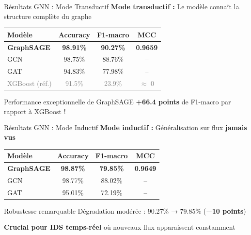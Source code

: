 ﻿\documentclass[aspectratio=169]{beamer}
\begin{document}
\begin{frame}{Résultats GNN : Mode Transductif}
\textbf{Mode transductif :} Le modèle connaît la structure complète du graphe

\vspace{0.5cm}

\begin{center}
\begin{tabular}{lccc}
\toprule
\textbf{Modèle} & \textbf{Accuracy} & \textbf{F1-macro} & \textbf{MCC} \\
\midrule
\textcolor{accentorange}{\textbf{GraphSAGE}} & \textbf{98.91\%} & \textbf{90.27\%} & \textbf{0.9659} \\
GCN & 98.75\% & 88.76\% & -- \\
GAT & 94.83\% & 77.98\% & -- \\
\midrule
\textcolor{gray}{XGBoost (réf.)} & \textcolor{gray}{91.5\%} & \textcolor{gray}{23.9\%} & \textcolor{gray}{$\approx$ 0} \\
\bottomrule
\end{tabular}
\end{center}

\vspace{0.5cm}

\begin{block}{Performance exceptionnelle de GraphSAGE}
\textcolor{accentorange}{\textbf{+66.4 points}} de F1-macro par rapport à XGBoost !
\end{block}
\end{frame}

\begin{frame}{Résultats GNN : Mode Inductif}
\textbf{Mode inductif :} Généralisation sur flux \textcolor{accentorange}{\textbf{jamais vus}}

\vspace{0.5cm}

\begin{center}
\begin{tabular}{lccc}
\toprule
\textbf{Modèle} & \textbf{Accuracy} & \textbf{F1-macro} & \textbf{MCC} \\
\midrule
\textcolor{accentorange}{\textbf{GraphSAGE}} & \textbf{98.87\%} & \textbf{79.85\%} & \textbf{0.9649} \\
GCN & 98.77\% & 88.02\% & -- \\
GAT & 95.01\% & 72.19\% & -- \\
\bottomrule
\end{tabular}
\end{center}

\vspace{0.5cm}

\begin{exampleblock}{Robustesse remarquable}
Dégradation modérée : 90.27\% → 79.85\% (\textcolor{accentorange}{\textbf{−10 points}})
\end{exampleblock}

\vspace{0.3cm}

\textbf{Crucial pour IDS temps-réel} où nouveaux flux apparaissent constamment
\end{frame}
\end{document}
